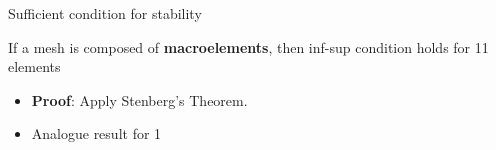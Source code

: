 
\begin{frame}{Sufficient condition for stability}
  \begin{corollary}
    If a mesh is composed of \textbf{\yUnstructured macroelements}, then
    \alert{inf-sup condition holds for 11} elements
  \end{corollary}
  \begin{center}
  \end{center}
  \begin{itemize}\itemsep0.9em
  \item \textbf{Proof}: Apply Stenberg's Theorem.
  \item Analogue result for 1
  \end{itemize}
\end{frame}

